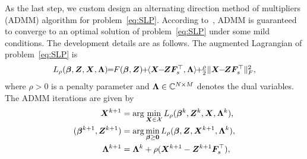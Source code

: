 \documentclass[10pt,twocolumn,twoside]{IEEEtran}
\begin{document}
As the last step,
we custom design an alternating direction method of multipliers (ADMM) algorithm for problem~\eqref{eq:SLP}.
According to~\cite{boyd2011distributed}, ADMM is guaranteed to converge to an optimal solution of problem~\eqref{eq:SLP} under some mild conditions.
The development details are as follows.
The augmented Lagrangian of problem~\eqref{eq:SLP} is
\begin{equation*}
	\begin{aligned}
		L_{\rho}(\bm \beta,\bZ,\bX, \bm \Lambda) \!\!=\!\! \textstyle F(\bm \beta, \bZ)\!\! + \!\!  \langle \bX \!\!-\!\! \bZ \bF_s^\Tsf, \bm \Lambda \rangle \!\!+ \!\! \frac{\rho}{2}\| \bX \!\!-\!\! \bZ \bF_s^\Tsf \|_F^2,
	\end{aligned}
\end{equation*}
where
$\rho > 0$ is a penalty parameter and
$\bm \Lambda \in \mathbb{C}^{N \times M}$ denotes the dual variables.
The ADMM iterations are given by
\begin{subequations}\label{eq:admm}
	\begin{align}
		{\bm X}^{k+1} &= \arg\min\limits_{{\bm X} \in \mathcal{X}} L_{\rho}(\bm \beta^k,{\bm Z}^k,{\bm X}, \bm \Lambda^{k}), \label{eq:admm_pro1}\\
		(\bm \beta^{k+1} ,{\bm Z}^{k+1}) &= \arg\min\limits_{\bm \beta \ge \bm 0} L_{\rho}(\bm \beta,{\bm Z},{\bm X}^{k+1}, \bm \Lambda^{k}), \label{eq:admm_pro2}\\
		\boldsymbol{\Lambda}^{k+1} &= \boldsymbol{\Lambda}^{k} + \rho ({\bm X}^{k+1} - {\bm Z}^{k+1} {\bm F}_s^\top),\label{eq:admm_pro3}
	\end{align}
\end{subequations}
\end{document}
